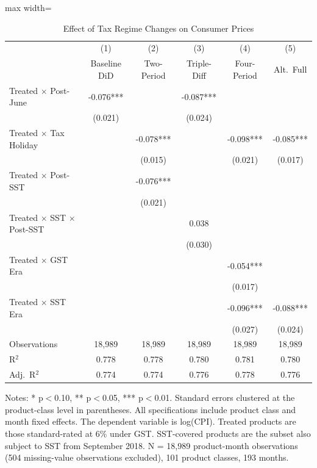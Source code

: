 \begin{table}[H]
\centering
\caption{Effect of Tax Regime Changes on Consumer Prices}
\label{tab:main}
\begin{adjustbox}{max width=\textwidth}
\begin{threeparttable}
\begin{tabular}{lccccc}
\toprule
 & (1) & (2) & (3) & (4) & (5) \\
 & Baseline DiD & Two-Period & Triple-Diff & Four-Period & Alt.\ Full \\
\midrule
Treated $\times$ Post-June & -0.076*** & & -0.087*** & & \\
 & (0.021) & & (0.024) & & \\
Treated $\times$ Tax Holiday & & -0.078*** & & -0.098*** & -0.085*** \\
 & & (0.015) & & (0.021) & (0.017) \\
Treated $\times$ Post-SST & & -0.076*** & & & \\
 & & (0.021) & & & \\
Treated $\times$ SST $\times$ Post-SST & & & 0.038 & & \\
 & & & (0.030) & & \\
Treated $\times$ GST Era & & & & -0.054*** & \\
 & & & & (0.017) & \\
Treated $\times$ SST Era & & & & -0.096*** & -0.088*** \\
 & & & & (0.027) & (0.024) \\
\midrule
Observations & 18,989 & 18,989 & 18,989 & 18,989 & 18,989 \\
R$^2$ & 0.778 & 0.778 & 0.780 & 0.781 & 0.780 \\
Adj.\ R$^2$ & 0.774 & 0.774 & 0.776 & 0.778 & 0.776 \\
\bottomrule
\end{tabular}
\begin{tablenotes}[flushleft]
\small
\item Notes: * p$<$0.10, ** p$<$0.05, *** p$<$0.01. Standard errors clustered at the product-class level in parentheses. All specifications include product class and month fixed effects. The dependent variable is log(CPI). Treated products are those standard-rated at 6\% under GST. SST-covered products are the subset also subject to SST from September 2018. N = 18,989 product-month observations (504 missing-value observations excluded), 101 product classes, 193 months.
\end{tablenotes}
\end{threeparttable}
\end{adjustbox}
\end{table}

